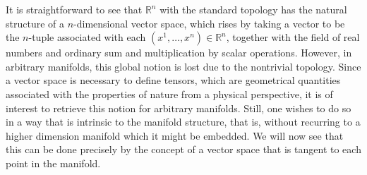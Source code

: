 \documentclass[
12pt,		%
openright,	%
twoside,  %
a4paper,			%
chapter=TITLE,		%
english,			%
french,				%
spanish,			%
brazil				%
]{USPSC-classe/USPSC}
\begin{document}
\begin{apendicesenv}
It is straightforward to see that $\mathbb{R}^n$ with the standard topology has the natural structure of a $n$-dimensional vector space, which rises by taking a vector to be the $n$-tuple associated with each $(x^1,\ldots,x^n)\in\mathbb{R}^n$, together with the field of real numbers and ordinary sum and multiplication by scalar operations. However, in arbitrary manifolds, this global notion is lost due to the nontrivial topology. Since a vector space is necessary to define tensors, which are geometrical quantities associated with the properties of nature from a physical perspective, it is of interest to retrieve this notion for arbitrary manifolds. Still, one wishes to do so in a way that is intrinsic to the manifold structure, that is, without recurring to a higher dimension manifold which it might be embedded. We will now see that this can be done precisely by the concept of a vector space that is tangent to each point in the manifold.


\end{apendicesenv}
\end{document}
